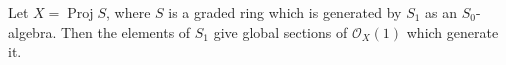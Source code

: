 Let $X = \operatorname{Proj} S$, where $S$ is a graded ring which is generated by $S_1$ as an $S_0$-algebra. Then the elements of $S_1$ give global sections of $\mathcal{O}_X(1)$ which generate it.

